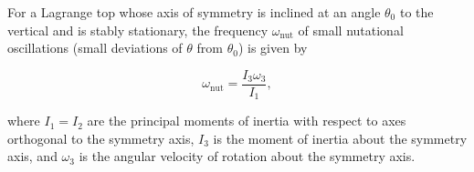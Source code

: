 For a Lagrange top whose axis of symmetry is inclined at an angle $\theta_0$ to the vertical and is stably stationary, the frequency $\omega_{\text{nut}}$ of small nutational oscillations (small deviations of $\theta$ from $\theta_0$) is given by

$$\omega_{\text{nut}} = \frac{I_3 \omega_3}{I_1},$$

where $I_1 = I_2$ are the principal moments of inertia with respect to axes orthogonal to the symmetry axis, $I_3$ is the moment of inertia about the symmetry axis, and $\omega_3$ is the angular velocity of rotation about the symmetry axis.
